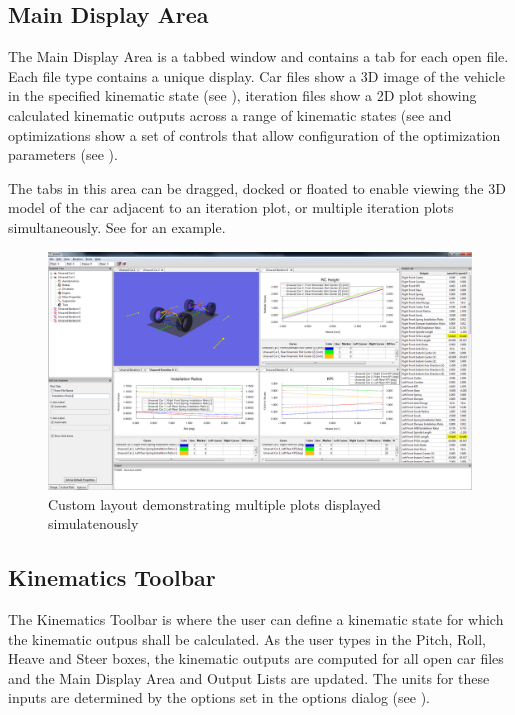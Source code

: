 \subsection{Main Display Area} \label{ssec:mainDisplayArea}

The Main Display Area is a tabbed window and contains a tab for each open file.  Each file type contains a unique display.  Car files show a 3D image of the vehicle in the specified kinematic state (see ), iteration files show a 2D plot showing calculated kinematic outputs across a range of kinematic states (see  and optimizations show a set of controls that allow configuration of the optimization parameters (see ).

The tabs in this area can be dragged, docked or floated to enable viewing the 3D model of the car adjacent to an iteration plot, or multiple iteration plots simultaneously.  See  for an example.

\begin{figure}
\includegraphics[width=\textwidth]{images/multiPlot}
\caption{Custom layout demonstrating multiple plots displayed simulatenously} \label{fig:multiPlot}
\centering
\end{figure}

\subsection{Kinematics Toolbar} \label{ssec:kinematicsToolbar}

The Kinematics Toolbar is where the user can define a kinematic state for which the kinematic outpus shall be calculated.  As the user types in the Pitch, Roll, Heave and Steer boxes, the kinematic outputs are computed for all open car files and the Main Display Area and Output Lists are updated.  The units for these inputs are determined by the options set in the options dialog (see ).

